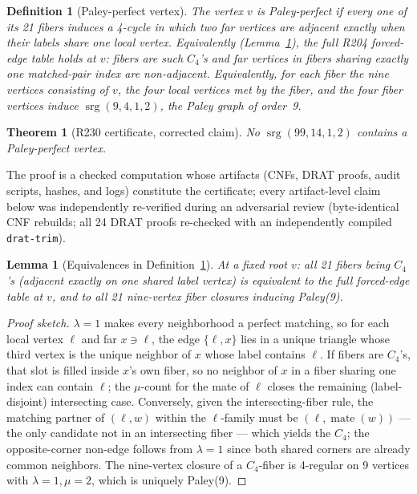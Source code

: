\documentclass[11pt]{article}
\newtheorem{theorem}{Theorem}
\newtheorem{lemma}{Lemma}
\newtheorem{definition}{Definition}
\begin{document}
\begin{definition}[Paley-perfect vertex]\label{def:pp}
The vertex \(v\) is \emph{Paley-perfect} if every one of its 21 fibers induces
a 4-cycle in which two far vertices are adjacent exactly when their labels
share one local vertex.  Equivalently (Lemma~\ref{lem:equiv}), the full R204
forced-edge table holds at \(v\): fibers are such \(C_4\)'s \emph{and} far
vertices in fibers sharing exactly one matched-pair index are non-adjacent.
Equivalently, for each fiber the nine vertices consisting of \(v\), the four
local vertices met by the fiber, and the four fiber vertices induce
\(\operatorname{srg}(9,4,1,2)\), the Paley graph of order~9.
\end{definition}

\begin{theorem}[R230 certificate, corrected claim]\label{thm:main}
No \(\operatorname{srg}(99,14,1,2)\) contains a Paley-perfect vertex.
\end{theorem}

The proof is a checked computation whose artifacts (CNFs, DRAT proofs, audit
scripts, hashes, and logs) constitute the certificate; every artifact-level
claim below was independently re-verified during an adversarial review
(byte-identical CNF rebuilds; all 24 DRAT proofs re-checked with an
independently compiled \texttt{drat-trim}).

\begin{lemma}[Equivalences in Definition~\ref{def:pp}]\label{lem:equiv}
At a fixed root \(v\): all 21 fibers being \(C_4\)'s (adjacent exactly on
one shared label vertex) is equivalent to the full forced-edge table at
\(v\), and to all 21 nine-vertex fiber closures inducing Paley(9).
\end{lemma}

\begin{proof}[Proof sketch]
\(\lambda=1\) makes every neighborhood a perfect matching, so for each local
vertex \(\ell\) and far \(x\ni\ell\), the edge \(\{\ell,x\}\) lies in a unique
triangle whose third vertex is the unique neighbor of \(x\) whose label
contains \(\ell\).  If fibers are \(C_4\)'s, that slot is filled inside
\(x\)'s own fiber, so no neighbor of \(x\) in a fiber sharing one index can
contain \(\ell\); the \(\mu\)-count for the mate of \(\ell\) closes the
remaining (label-disjoint) intersecting case.  Conversely, given the
intersecting-fiber rule, the matching partner of \((\ell,w)\) within the
\(\ell\)-family must be \((\ell,\operatorname{mate}(w))\) --- the only
candidate not in an intersecting fiber --- which yields the \(C_4\); the
opposite-corner non-edge follows from \(\lambda=1\) since both shared
corners are already common neighbors.  The nine-vertex closure of a
\(C_4\)-fiber is 4-regular on 9 vertices with \(\lambda=1,\mu=2\), which is
uniquely Paley(9).
\end{proof}
\end{document}
